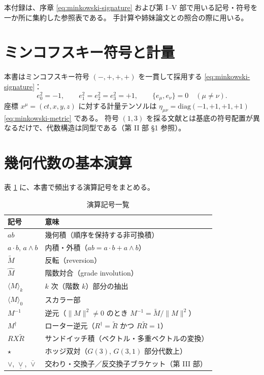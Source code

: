 \documentclass[dvipdfmx,a4paper,oneside]{jsbook}
\numberwithin{equation}{chapter}
\begin{document}
本付録は、序章 \eqref{eq:minkowski-signature} および第 I–V 部で用いる記号・符号を一か所に集約した参照表である。
手計算や姉妹論文との照合の際に用いる。

\section{ミンコフスキー符号と計量}

本書はミンコフスキー符号 \((-,+,+,+)\) を一貫して採用する \eqref{eq:minkowski-signature}：
\begin{equation}
  e_0^2 = -1, \qquad e_1^2 = e_2^2 = e_3^2 = +1, \qquad \{e_\mu, e_\nu\} = 0 \quad (\mu \neq \nu).
  \label{eq:app-minkowski}
\end{equation}
座標 \(x^\mu = (ct, x, y, z)\) に対する計量テンソルは \(\eta_{\mu\nu} = \mathrm{diag}(-1,+1,+1,+1)\) \eqref{eq:minkowski-metric} である。
符号 \((1,3)\) を採る文献とは基底の符号配置が異なるだけで、代数構造は同型である（第 II 部 §1 参照）。

\section{幾何代数の基本演算}

表 \ref{tab:app-operations} に、本書で頻出する演算記号をまとめる。

\begin{table}[htbp]
  \centering
  \caption{演算記号一覧}
  \label{tab:app-operations}
  \begin{tabular}{@{}ll@{}}
    \toprule
    記号 & 意味 \\
    \midrule
    \(ab\) & 幾何積（順序を保持する非可換積） \\
    \(a\cdot b\), \(a\wedge b\) & 内積・外積（\(ab = a\cdot b + a\wedge b\)） \\
    \(\widetilde{M}\) & 反転（reversion） \\
    \(\widehat{M}\) & 階数対合（grade involution） \\
    \(\langle M\rangle_k\) & \(k\) 次（階数 \(k\)）部分の抽出 \\
    \(\langle M\rangle_0\) & スカラー部 \\
    \(M^{-1}\) & 逆元（\(\|M\|^2 \neq 0\) のとき \(M^{-1} = \widetilde{M}/\|M\|^2\)） \\
    \(M^\dagger\) & ローター逆元（\(R^\dagger = \widetilde{R}\) かつ \(R\widetilde{R}=1\)） \\
    \(RX\widetilde{R}\) & サンドイッチ積（ベクトル・多重ベクトルの変換） \\
    \(\star\) & ホッジ双対（\(G(3)\), \(G(3,1)\) 部分代数上） \\
    \(\vee\), \(\mathbin{\underline{\vee}}\), \(\mathbin{\overline{\vee}}\) & 交わり・交換子／反交換子ブラケット（第 III 部） \\
    \bottomrule
  \end{tabular}
\end{table}
\end{document}
